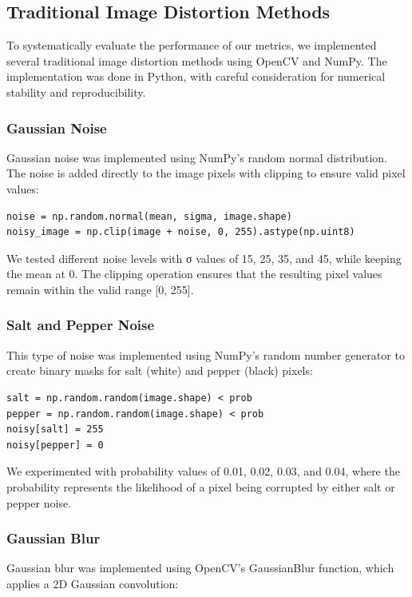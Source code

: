 \documentclass[a4paper,12pt]{article}
\begin{document}
\subsection{Traditional Image Distortion Methods}
To systematically evaluate the performance of our metrics, we implemented several traditional image distortion methods using OpenCV and NumPy. The implementation was done in Python, with careful consideration for numerical stability and reproducibility.

\subsubsection{Gaussian Noise}
Gaussian noise was implemented using NumPy's random normal distribution. The noise is added directly to the image pixels with clipping to ensure valid pixel values:

\begin{verbatim}
noise = np.random.normal(mean, sigma, image.shape)
noisy_image = np.clip(image + noise, 0, 255).astype(np.uint8)
\end{verbatim}

We tested different noise levels with σ values of 15, 25, 35, and 45, while keeping the mean at 0. The clipping operation ensures that the resulting pixel values remain within the valid range [0, 255].

\subsubsection{Salt and Pepper Noise}
This type of noise was implemented using NumPy's random number generator to create binary masks for salt (white) and pepper (black) pixels:

\begin{verbatim}
salt = np.random.random(image.shape) < prob
pepper = np.random.random(image.shape) < prob
noisy[salt] = 255
noisy[pepper] = 0
\end{verbatim}

We experimented with probability values of 0.01, 0.02, 0.03, and 0.04, where the probability represents the likelihood of a pixel being corrupted by either salt or pepper noise.

\subsubsection{Gaussian Blur}
Gaussian blur was implemented using OpenCV's GaussianBlur function, which applies a 2D Gaussian convolution:
\end{document}
